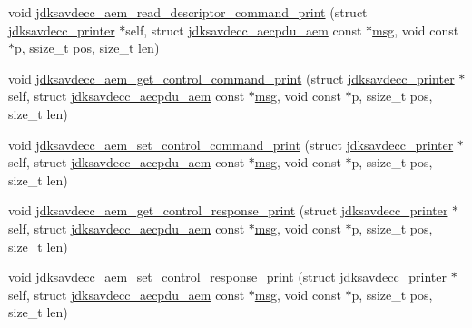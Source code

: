\begin{DoxyCompactItemize}
\item 
void \hyperlink{group__aem__print_ga966f9d45d0fcc7fd795ae774ee57c422}{jdksavdecc\+\_\+aem\+\_\+read\+\_\+descriptor\+\_\+command\+\_\+print} (struct \hyperlink{structjdksavdecc__printer}{jdksavdecc\+\_\+printer} $\ast$self, struct \hyperlink{structjdksavdecc__aecpdu__aem}{jdksavdecc\+\_\+aecpdu\+\_\+aem} const $\ast$\hyperlink{openavb__log_8c_a0c7e58a50354c4a4d6dad428d0e47029}{msg}, void const $\ast$p, ssize\+\_\+t pos, size\+\_\+t len)
\item 
void \hyperlink{group__aem__print_ga1fd77391f3d8ceb280957198d3512435}{jdksavdecc\+\_\+aem\+\_\+get\+\_\+control\+\_\+command\+\_\+print} (struct \hyperlink{structjdksavdecc__printer}{jdksavdecc\+\_\+printer} $\ast$self, struct \hyperlink{structjdksavdecc__aecpdu__aem}{jdksavdecc\+\_\+aecpdu\+\_\+aem} const $\ast$\hyperlink{openavb__log_8c_a0c7e58a50354c4a4d6dad428d0e47029}{msg}, void const $\ast$p, ssize\+\_\+t pos, size\+\_\+t len)
\item 
void \hyperlink{group__aem__print_gad7ab8c1f00ab43eef7206ee43adb8d48}{jdksavdecc\+\_\+aem\+\_\+set\+\_\+control\+\_\+command\+\_\+print} (struct \hyperlink{structjdksavdecc__printer}{jdksavdecc\+\_\+printer} $\ast$self, struct \hyperlink{structjdksavdecc__aecpdu__aem}{jdksavdecc\+\_\+aecpdu\+\_\+aem} const $\ast$\hyperlink{openavb__log_8c_a0c7e58a50354c4a4d6dad428d0e47029}{msg}, void const $\ast$p, ssize\+\_\+t pos, size\+\_\+t len)
\item 
void \hyperlink{group__aem__print_gae342e36984fb0fa396b4a2192413e260}{jdksavdecc\+\_\+aem\+\_\+get\+\_\+control\+\_\+response\+\_\+print} (struct \hyperlink{structjdksavdecc__printer}{jdksavdecc\+\_\+printer} $\ast$self, struct \hyperlink{structjdksavdecc__aecpdu__aem}{jdksavdecc\+\_\+aecpdu\+\_\+aem} const $\ast$\hyperlink{openavb__log_8c_a0c7e58a50354c4a4d6dad428d0e47029}{msg}, void const $\ast$p, ssize\+\_\+t pos, size\+\_\+t len)
\item 
void \hyperlink{group__aem__print_ga8ed15b2b67bfa68a7f5bebbdddc305f6}{jdksavdecc\+\_\+aem\+\_\+set\+\_\+control\+\_\+response\+\_\+print} (struct \hyperlink{structjdksavdecc__printer}{jdksavdecc\+\_\+printer} $\ast$self, struct \hyperlink{structjdksavdecc__aecpdu__aem}{jdksavdecc\+\_\+aecpdu\+\_\+aem} const $\ast$\hyperlink{openavb__log_8c_a0c7e58a50354c4a4d6dad428d0e47029}{msg}, void const $\ast$p, ssize\+\_\+t pos, size\+\_\+t len)
\end{DoxyCompactItemize}
